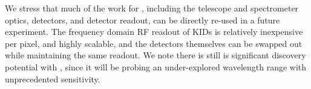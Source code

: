 
% 
% 
% 
\parskip0pt








We stress that much of the work for \name, including the telescope and spectrometer optics, detectors, and detector readout, can be directly re-used in a future experiment. The frequency domain RF readout of KIDs is relatively inexpensive per pixel, and highly scalable, and the detectors themselves can be swapped out while maintaining the same readout.  We note there is still is significant discovery potential with \name, since it will be probing an under-explored wavelength range with unprecedented sensitivity.


